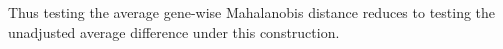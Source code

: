 \noindent Thus testing the average gene-wise Mahalanobis distance reduces to testing the unadjusted average difference under this construction.
%
